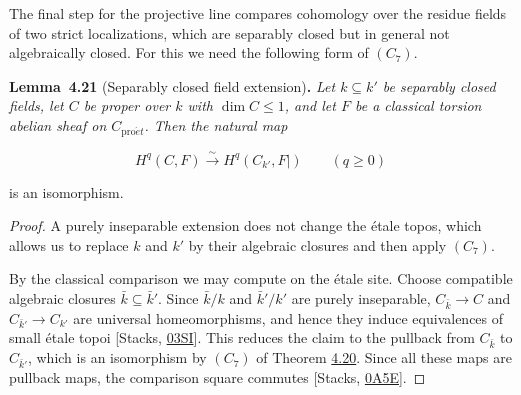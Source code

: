 \documentclass[11pt]{article}
\newenvironment{bpstatement}[2]{\par\addvspace{0.6\baselineskip}\noindent\textbf{#1}#2\textbf{.}\enspace\ignorespaces}
  {\par\addvspace{0.4\baselineskip}}
\newenvironment{bpstatementit}[2]{\begin{bpstatement}{#1}{#2}\itshape\ignorespaces}{\end{bpstatement}}
\begin{document}
\label{bp343}%
The final step for the projective line compares cohomology over the residue fields of two strict localizations, which are separably closed but in general not algebraically closed. For this we need the following form of \((C_7)\).

\label{bp344}%
\begin{bpstatementit}{Lemma~4.21}{ (Separably closed field extension)}
Let \(k\subseteq k'\) be separably closed fields, let \(C\) be proper over \(k\) with \(\dim C\leq1\), and let \(F\) be a classical torsion abelian sheaf on \(C_{\mathrm{pro}\acute{e}t}\). Then the natural map

\[
H^q(C,F)\xrightarrow{\sim}H^q(C_{k'},F|)
\qquad(q\geq0)
\]

is an isomorphism.
\end{bpstatementit}

\begin{proof}[{Proof}]\label{bp345}%
A purely inseparable extension does not change the étale topos, which allows us to replace \(k\) and \(k'\) by their algebraic closures and then apply \((C_7)\).

By the classical comparison we may compute on the étale site. Choose compatible algebraic closures \(\bar k\subseteq\bar k'\). Since \(\bar k/k\) and \(\bar k'/k'\) are purely inseparable, \(C_{\bar k}\to C\) and \(C_{\bar k'}\to C_{k'}\) are universal homeomorphisms, and hence they induce equivalences of small étale topoi [Stacks, \href{https://stacks.math.columbia.edu/tag/03SI}{03SI}]. This reduces the claim to the pullback from \(C_{\bar k}\) to \(C_{\bar k'}\), which is an isomorphism by \((C_7)\) of Theorem \hyperref[bp340]{4.20}. Since all these maps are pullback maps, the comparison square commutes [Stacks, \href{https://stacks.math.columbia.edu/tag/0A5E}{0A5E}].
\end{proof}
\end{document}
